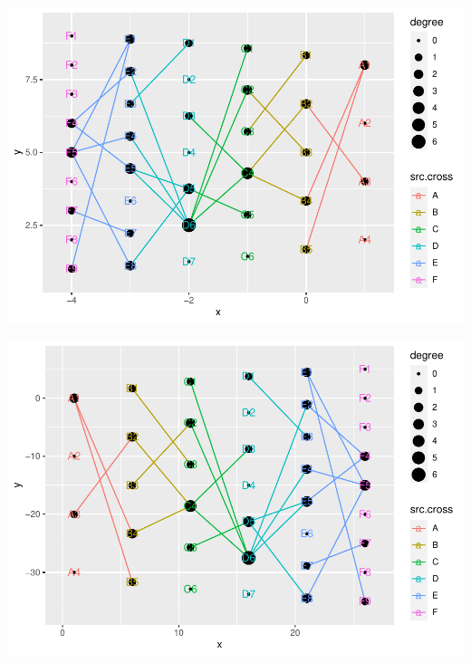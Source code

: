 \documentclass[
]{article}
\newenvironment{Shaded}{\begin{snugshade}}{\end{snugshade}}
\newcommand{\CommentTok}[1]{\textcolor[rgb]{0.56,0.35,0.01}{\textit{#1}}}
\newcommand{\DataTypeTok}[1]{\textcolor[rgb]{0.13,0.29,0.53}{#1}}
\newcommand{\DecValTok}[1]{\textcolor[rgb]{0.00,0.00,0.81}{#1}}
\newcommand{\KeywordTok}[1]{\textcolor[rgb]{0.13,0.29,0.53}{\textbf{#1}}}
\newcommand{\NormalTok}[1]{#1}
\newcommand{\OperatorTok}[1]{\textcolor[rgb]{0.81,0.36,0.00}{\textbf{#1}}}
\newcommand{\StringTok}[1]{\textcolor[rgb]{0.31,0.60,0.02}{#1}}
\begin{document}
\begin{Shaded}
\end{Shaded}

\includegraphics{ReadMe1_files/figure-latex/unnamed-chunk-6-4.pdf}

\begin{Shaded}
\end{Shaded}

\includegraphics{ReadMe1_files/figure-latex/unnamed-chunk-6-5.pdf}
\end{document}

